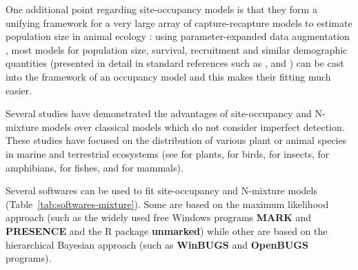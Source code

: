 \documentclass[a4paper, 12pt, leqno]{article}\usepackage[]{graphicx}\usepackage[]{color}
\begin{document}
One additional point regarding site-occupancy models is that they form a unifying
framework for a very large array of capture-recapture models to estimate population size
in animal ecology \citep{Nichols1992}: using parameter-expanded data augmentation
\citep{Royle2007}, most models for population size, survival, recruitment and similar
demographic quantities (presented in detail in standard references such as
\citet{Williams2002}, \citet{Royle2008} and \citet{Kery2012}) can be cast into the
framework of an occupancy model and this makes their fitting much easier.

Several studies have demonstrated the advantages of site-occupancy and N-mixture models
over classical models which do not consider imperfect detection. These studies have
focused on the distribution of various plant or animal species in marine and terrestrial
ecosystems (see \citet{Chen2013,Latimer2006} for plants,
\citet{Kery2005,Rota2011,Dorazio2006,Royle2004} for birds, \citet{Kery2010} for insects,
\citet{Bailey2004,MacKenzie2002,Chelgren2011} for amphibians, \citet{Monk2014} for fishes,
and \citet{Poley2014,Gray2012} for mammals).

Several softwares can be used to fit site-occupancy and N-mixture models
(Table~\ref{tab:softwares-mixture}). Some are based on the maximum likelihood approach (such as
the widely used free Windows programs \textbf{MARK} and \textbf{PRESENCE} and the R
package \textbf{unmarked}) while other are based on the hierarchical Bayesian approach (such as
\textbf{WinBUGS} and \textbf{OpenBUGS} programs).
\end{document}
